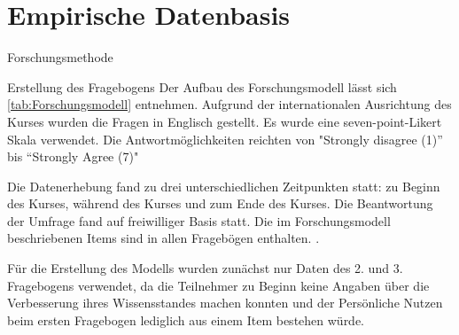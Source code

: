 \section{Empirische Datenbasis}
\label{sec:emp_daten}

Forschungsmethode

Erstellung des Fragebogens
Der Aufbau des Forschungsmodell lässt sich \ref{tab:Forschungsmodell} entnehmen. Aufgrund der internationalen Ausrichtung des Kurses wurden die Fragen in Englisch gestellt. 
Es wurde eine seven-point-Likert Skala verwendet. Die Antwortmöglichkeiten reichten von "Strongly disagree (1)” bis “Strongly Agree (7)" 
 
Die Datenerhebung fand zu drei unterschiedlichen Zeitpunkten statt: zu Beginn des Kurses, während des Kurses und zum Ende des Kurses. Die Beantwortung der Umfrage fand auf freiwilliger Basis statt. Die im Forschungsmodell beschriebenen Items sind in allen Fragebögen enthalten. .

Für die Erstellung des Modells wurden zunächst nur Daten des 2. und 3. Fragebogens verwendet, da die Teilnehmer zu Beginn keine Angaben über die Verbesserung ihres Wissensstandes machen konnten und der Persönliche Nutzen beim ersten Fragebogen lediglich aus einem Item bestehen würde. 
 

